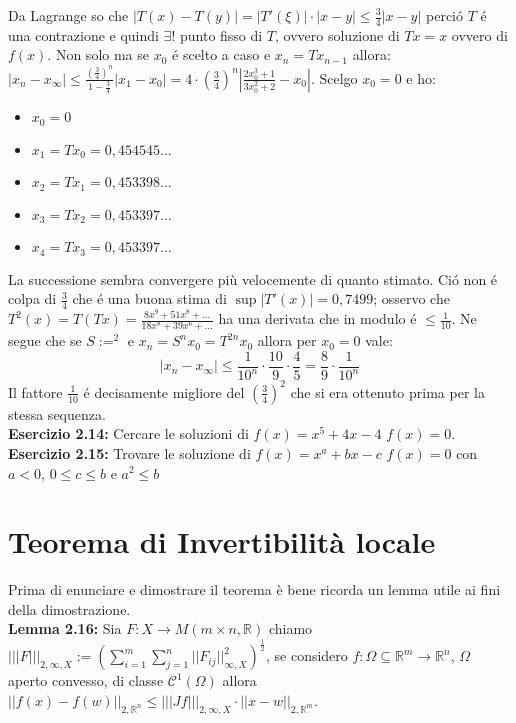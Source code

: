 \documentclass[a4paper,11pt,titlepage]{book}
\begin{document}
Da Lagrange so che $|T(x)-T(y)|=|T'(\xi)|\cdot|x-y|\leq\frac{3}{4}|x-y|$ perció $T$ é una contrazione e quindi $\exists !$ punto fisso di $T$, ovvero soluzione di $Tx=x$ ovvero di $f(x)$. Non solo ma se $x_0$ é scelto a caso e $x_n=Tx_{n-1}$ allora: $|x_n-x_\infty|\leq\frac{\left(\frac{3}{4}\right)^n}{1-\frac{3}{4}}|x_1-x_0|=4\cdot\left(\frac{3}{4}\right)^n|\frac{2x_0^3+1}{3x_0^2+2}-x_0|$. Scelgo $x_0=0$ e ho:\begin{itemize}
	\item $x_0=0$
	\item $x_1=Tx_0=0,454545\ldots$
	\item $x_2=Tx_1=0,453398\ldots$
	\item $x_3=Tx_2=0,453397\ldots$
	\item $x_4=Tx_3=0,453397\ldots$\\
\end{itemize}

La successione sembra convergere più velocemente di quanto stimato. Ció non é colpa di $\frac{3}{4}$ che é una buona stima di $\sup|T'(x)|=0,7499$; osservo che $T^2(x)=T(Tx)=\frac{8x^9+51x^8+\ldots}{18x^8+39x^6+\ldots}$ ha una derivata che in modulo é $\leq\frac{1}{10}$. Ne segue che se $S:=^2$ e $x_n=S^nx_0=T^{2n}x_0$ allora per $x_0=0$ vale: $$|x_n-x_\infty|\leq\frac{1}{10^n}\cdot\frac{10}{9}\cdot\frac{4}{5}=\frac{8}{9}\cdot\frac{1}{10^n}$$ Il fattore $\frac{1}{10}$ é decisamente migliore del $\left(\frac{3}{4}\right)^2$ che si era ottenuto prima per la stessa sequenza.\\

\textbf{Esercizio 2.14:} Cercare le soluzioni di $f(x)=x^5+4x-4$ $f(x)=0$.\\

\textbf{Esercizio 2.15:} Trovare le soluzione di $f(x)=x^a+bx-c$ $f(x)=0$ con $a<0$, $0\leq c\leq b$ e $a^2\leq b$



\section{Teorema di Invertibilità locale}

Prima di enunciare e dimostrare il teorema è bene ricorda un lemma utile ai fini della dimostrazione. \\

\textbf{Lemma 2.16:} Sia $F:X\to M(m\times n,\mathbb{R})$ chiamo $|||F|||_{2,\infty,X}:=\left(\sum^m_{i=1}\sum^n_{j=1}||F_{ij}||^2_{\infty,X}\right)^{\frac{1}{2}}$, se considero $f:\Omega\subseteq\mathbb{R}^m\to\mathbb{R}^n$, $\Omega$ aperto convesso, di classe $\mathcal{C}^1(\Omega)$ allora $||f(x)-f(w)||_{2,\mathbb{R}^n}\leq|||Jf|||_{2,\infty,X}\cdot||x-w||_{2,\mathbb{R}^m}$.\\
\end{document}
